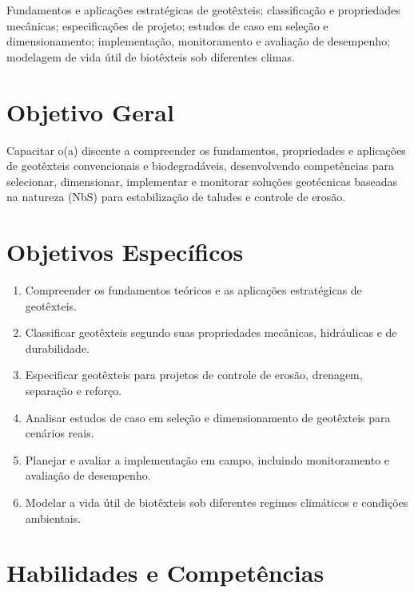 \documentclass[11pt,a4paper]{article}
\begin{document}
\begin{tcolorbox}[ementabox]
Fundamentos e aplicações estratégicas de geotêxteis; classificação e propriedades mecânicas; especificações de projeto; estudos de caso em seleção e dimensionamento; implementação, monitoramento e avaliação de desempenho; modelagem de vida útil de biotêxteis sob diferentes climas.
\end{tcolorbox}


\section*{Objetivo Geral}

Capacitar o(a) discente a compreender os fundamentos, propriedades e aplicações de geotêxteis convencionais e biodegradáveis, desenvolvendo competências para selecionar, dimensionar, implementar e monitorar soluções geotécnicas baseadas na natureza (NbS) para estabilização de taludes e controle de erosão.

\section*{Objetivos Específicos}

\begin{enumerate}

\item Compreender os fundamentos teóricos e as aplicações estratégicas de geotêxteis.

\item Classificar geotêxteis segundo suas propriedades mecânicas, hidráulicas e de durabilidade.

\item Especificar geotêxteis para projetos de controle de erosão, drenagem, separação e reforço.

\item Analisar estudos de caso em seleção e dimensionamento de geotêxteis para cenários reais.

\item Planejar e avaliar a implementação em campo, incluindo monitoramento e avaliação de desempenho.

\item Modelar a vida útil de biotêxteis sob diferentes regimes climáticos e condições ambientais.

\end{enumerate}

\section*{Habilidades e Competências}
\end{document}
